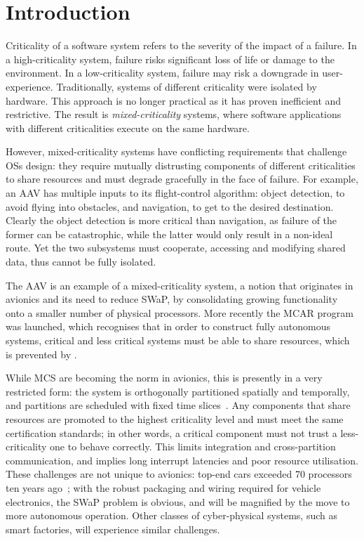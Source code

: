 \chapter{Introduction}

Criticality of a software system refers to the severity of the impact of a failure.  In a
high-criticality system, failure risks significant loss of life or damage to the environment.  In a
low-criticality system, failure may risk a downgrade in user-experience.  Traditionally, systems of
different criticality were isolated by hardware.  This approach is no longer practical as it has
proven inefficient and restrictive.  The result is \emph{mixed-criticality} systems, where software
applications with different criticalities execute on the same hardware.

However, mixed-criticality systems have conflicting requirements that challenge \glspl{OS} design:
they require mutually distrusting components of different criticalities to share resources and must
degrade gracefully in the face of failure.  For example, an \gls{AAV} has multiple inputs to its
flight-control algorithm: object detection, to avoid flying into obstacles, and navigation, to get
to the desired destination.  Clearly the object detection is more critical than navigation, as
failure of the former can be catastrophic, while the latter would only result in a non-ideal route.
Yet the two subsystems must cooperate, accessing and modifying shared data, thus cannot be fully
isolated.

The \gls{AAV} is an example of a mixed-criticality system, a notion that originates in avionics and its
need to reduce \gls{SWaP}, by consolidating growing functionality onto a smaller
number of physical processors. More recently the
\gls{MCAR}\citep{Barhorst_BBHPSSSSU_09} program was launched, which recognises that in order to
construct fully autonomous systems, critical and less critical systems must be able to share
resources, which is prevented by \citet{ARINC653}. 

While MCS are becoming the norm in avionics, this is presently in a very restricted form: the system
is orthogonally partitioned spatially and temporally, and partitions are scheduled with fixed time
slices~\citep{ARINC653}. Any components that share resources are promoted to the highest criticality
level and must meet the same certification standards; in other words, a critical component must not
trust a less-criticality one to behave correctly. This limits integration and cross-partition
communication, and implies long interrupt latencies and poor resource utilisation. 
These challenges are not unique to avionics: top-end cars exceeded 70 processors ten years
ago~\citep{Broy_KPS_07}; with the robust packaging and wiring required for vehicle electronics, the
SWaP problem is obvious, and will be magnified by the move to more autonomous operation. Other
classes of cyber-physical systems, such as smart factories, will experience similar challenges.

